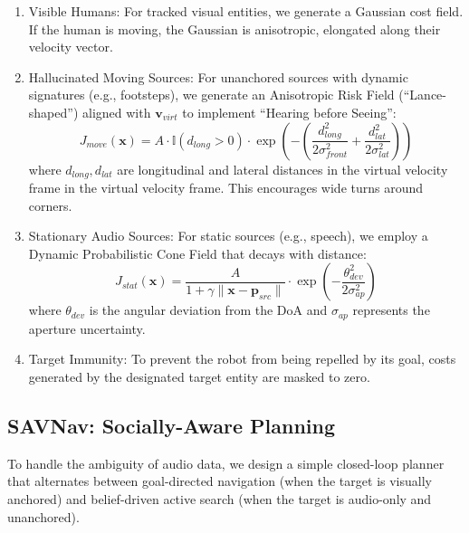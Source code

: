 \begin{enumerate}
    \def\labelenumi{\arabic{enumi}.}
    \item
          Visible Humans: For tracked visual entities, we generate a Gaussian
          cost field. If the human is moving, the Gaussian is anisotropic,
          elongated along their velocity vector.
    \item
          Hallucinated Moving Sources: For unanchored sources with dynamic signatures (e.g., footsteps), we generate an Anisotropic Risk Field (``Lance-shaped'') aligned with \(\mathbf{v}_{virt}\) to implement ``Hearing before Seeing'':
          \begin{equation}
              J_{move}(\mathbf{x}) = A \cdot \mathbb{I}(d_{long} > 0) \cdot \exp \left( - \left( \frac{d_{long}^2}{2\sigma_{front}^2} + \frac{d_{lat}^2}{2\sigma_{lat}^2} \right) \right)
              \label{eq:audio-risk-move}
          \end{equation}
          where \(d_{long}, d_{lat}\) are longitudinal and lateral distances in the virtual velocity frame in the virtual velocity frame. This encourages wide turns around corners.
    \item
          Stationary Audio Sources: For static sources (e.g., speech), we employ a Dynamic Probabilistic Cone Field that decays with distance:
          \begin{equation}
              J_{stat}(\mathbf{x}) = \frac{A}{1 + \gamma \|\mathbf{x} - \mathbf{p}_{src}\|} \cdot \exp\left(-\frac{\theta_{dev}^2}{2\sigma_{ap}^2}\right)
              \label{eq:audio-risk-stat}
          \end{equation}
          where \(\theta_{dev}\) is the angular deviation from the DoA and \(\sigma_{ap}\) represents the aperture uncertainty.
    \item
          Target Immunity: To prevent the robot from being repelled by its goal, costs generated by the designated target entity are masked to zero.
\end{enumerate}

\subsection{SAVNav: Socially-Aware
    Planning}\label{savnav-socially-aware-planning}

To handle the ambiguity of audio data, we design a simple closed-loop
planner that alternates between goal-directed navigation (when the
target is visually anchored) and belief-driven active search (when the
target is audio-only and unanchored).

